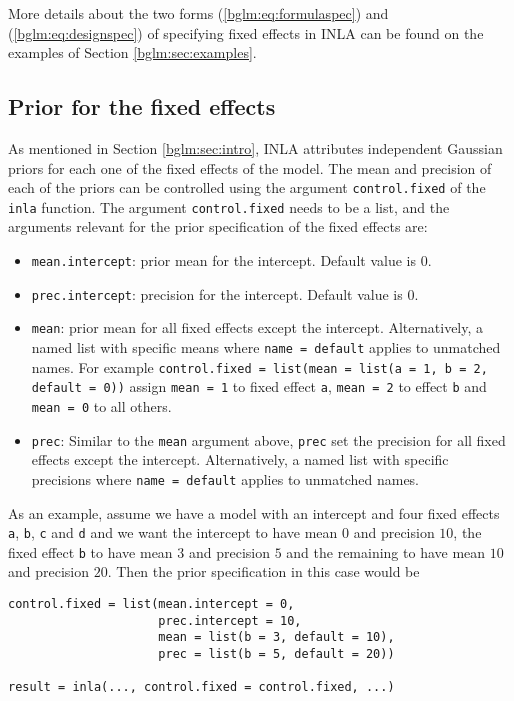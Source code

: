 \documentclass[a4paper,11pt]{report}
\newcommand{\tv}{\texttt}
\begin{document}
More details about the two forms (\ref{bglm:eq:formulaspec}) and
(\ref{bglm:eq:designspec}) of specifying fixed effects in INLA can be
found on the examples of Section \ref{bglm:sec:examples}.

\subsection{Prior for the fixed effects}

As mentioned in Section \ref{bglm:sec:intro}, INLA attributes
independent Gaussian priors for each one of the fixed effects of the
model. The mean and precision of each of the priors can be controlled
using the argument \texttt{control.fixed} of the \texttt{inla}
function.  The argument \texttt{control.fixed} needs to be a list, and
the arguments relevant for the prior specification of the fixed
effects are:
\begin{itemize}
\item \texttt{mean.intercept}: prior mean for the intercept. Default value is 0.
\item \texttt{prec.intercept}: precision for the intercept. Default value is 0.
\item \texttt{mean}: prior mean for all fixed effects except the intercept.
    Alternatively, a named list with specific means where \texttt{name = default} 
    applies to unmatched names. For example 
\texttt{control.fixed = list(mean = list(a = 1, b = 2, default = 0))} assign
\texttt{mean = 1} to fixed effect \texttt{a}, \texttt{mean = 2} to effect 
\texttt{b} and \texttt{mean = 0} to all others.
\item \texttt{prec}: Similar to the \texttt{mean} argument above, \texttt{prec} set the 
    precision for all fixed effects except the intercept. Alternatively, a named list with 
    specific precisions where \texttt{name = default} applies to unmatched names.
\end{itemize}

As an example, assume we have a model with an intercept and four fixed
effects \tv{a}, \tv{b}, \tv{c} and \tv{d} and we want the intercept to
have mean $0$ and precision $10$, the fixed effect \tv{b} to have mean
$3$ and precision $5$ and the remaining to have mean $10$ and
precision $20$. Then the prior specification in this case would be

\begin{verbatim}
control.fixed = list(mean.intercept = 0,
                     prec.intercept = 10,
                     mean = list(b = 3, default = 10),
                     prec = list(b = 5, default = 20))

result = inla(..., control.fixed = control.fixed, ...)
\end{verbatim}
\end{document}
